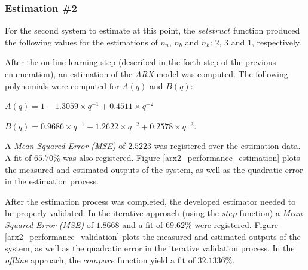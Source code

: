 \documentclass[11pt]{article}
\begin{document}
\subsubsection{Estimation \#2}
\label{estimation2}

For the second system to estimate at this point, the $selstruct$ function produced the following values for the estimations of $n_{a}$, $n_{b}$ and $n_{k}$: $2$, $3$ and $1$, respectively.

After the on-line learning step (described in the forth step of the previous enumeration), an estimation of the \emph{ARX} model was computed. The following polynomials were computed for $A(q)$ and $B(q)$:

$A(q) = 1 - 1.3059 \times q^{-1} + 0.4511 \times q^{-2}$

$B(q) = 0.9686 \times q^{-1} -1.2622 \times q^{-2} + 0.2578 \times q^{-3}$.

A \emph{Mean Squared Error (MSE)} of $2.5223$ was registered over the estimation data. A fit of $65.70\%$ was also registered. Figure \ref{arx2_performance_estimation} plots the measured and estimated outputs of the system, as well as the quadratic error in the estimation process.

After the estimation process was completed, the developed estimator needed to be properly validated. In the iterative approach (using the $step$ function) a \emph{Mean Squared Error (MSE)} of $1.8668$ and a fit of $69.62\%$ were registered. Figure \ref{arx2_performance_validation} plots the measured and estimated outputs of the system, as well as the quadratic error in the iterative validation process. In the \emph{offline} approach, the $compare$ function yield a fit of $32.1336\%$.
\end{document}
